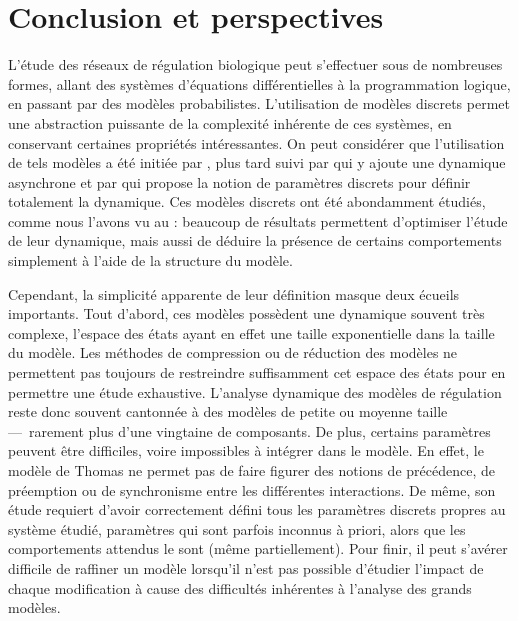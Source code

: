 
\chapter{Conclusion et perspectives}




L'étude des réseaux de régulation biologique peut s'effectuer sous de nombreuses formes,
allant des systèmes d'équations différentielles à la programmation logique,
en passant par des modèles probabilistes.
L'utilisation de modèles discrets permet une abstraction puissante de la complexité inhérente
de ces systèmes, en conservant certaines propriétés intéressantes.
On peut considérer que l'utilisation de tels modèles a été initiée par
, plus tard suivi par 
qui y ajoute une dynamique asynchrone
et par 
qui propose la notion de paramètres discrets pour définir totalement la dynamique.
Ces modèles discrets ont été abondamment étudiés,
comme nous l'avons vu au  :
beaucoup de résultats permettent d'optimiser l'étude de leur dynamique,
mais aussi de déduire la présence de certains comportements
simplement à l'aide de la structure du modèle.

Cependant, la simplicité apparente de leur définition masque deux écueils importants.
Tout d'abord, ces modèles possèdent une dynamique souvent très complexe,
l'espace des états ayant en effet une taille exponentielle dans la taille du modèle.
Les méthodes de compression ou de réduction des modèles ne permettent pas toujours
de restreindre suffisamment cet espace des états pour en permettre une étude exhaustive.
L'analyse dynamique des modèles de régulation reste donc souvent cantonnée
à des modèles de petite ou moyenne taille ---~rarement plus d'une vingtaine de composants.
De plus, certains paramètres peuvent être difficiles, voire impossibles à intégrer dans le modèle.
En effet, le modèle de Thomas ne permet pas de faire figurer des notions de précédence,
de préemption ou de synchronisme entre les différentes interactions.
De même, son étude requiert d'avoir correctement défini tous les paramètres discrets
propres au système étudié, paramètres qui sont parfois inconnus à priori,
alors que les comportements attendus le sont (même partiellement).
Pour finir, il peut s'avérer difficile de raffiner un modèle lorsqu'il n'est pas
possible d'étudier l'impact de chaque modification
à cause des difficultés inhérentes à l'analyse des grands modèles.

